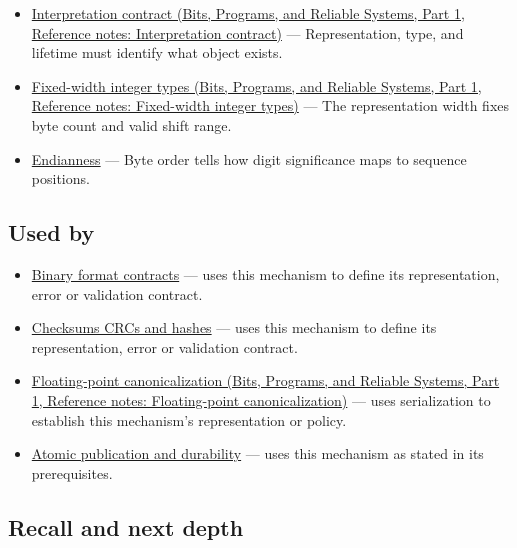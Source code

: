 \hypertarget{appendix-91d09ebed979-prerequisites}{}

\begin{itemize}
\tightlist
\item
  \href{../01-Bits-Programs-and-Reliable-Systems-P01/main.pdf\#nameddest=appendix-f414bd4ed05c}{Interpretation contract (Bits, Programs, and Reliable Systems, Part 1, Reference notes: Interpretation contract)} --- Representation, type, and lifetime must identify what object exists.
\item
  \href{../01-Bits-Programs-and-Reliable-Systems-P01/main.pdf\#nameddest=appendix-cc04044b5782}{Fixed-width integer types (Bits, Programs, and Reliable Systems, Part 1, Reference notes: Fixed-width integer types)} --- The representation width fixes byte count and valid shift range.
\item
  \hyperref[appendix-bc07c3d25b18]{Endianness} --- Byte order tells how digit significance maps to sequence positions.
\end{itemize}

\subsection{Used by}\label{appendix-91d09ebed979-used-by}

\hypertarget{appendix-91d09ebed979-used-by}{}

\begin{itemize}
\item
  \hyperref[appendix-590bbb2424c1]{Binary format contracts} --- uses this mechanism to define its representation, error or validation contract.
\item
  \hyperref[appendix-ed338677de0a]{Checksums CRCs and hashes} --- uses this mechanism to define its representation, error or validation contract.
\item
  \href{../01-Bits-Programs-and-Reliable-Systems-P01/main.pdf\#nameddest=appendix-e90053a4b201}{Floating-point canonicalization (Bits, Programs, and Reliable Systems, Part 1, Reference notes: Floating-point canonicalization)} --- uses serialization to establish this mechanism's representation or policy.
\item
  \hyperref[appendix-e89a8f290ef5]{Atomic publication and durability} --- uses this mechanism as stated in its prerequisites.
\end{itemize}

\subsection{Recall and next depth}\label{appendix-91d09ebed979-recall-and-next-depth}

